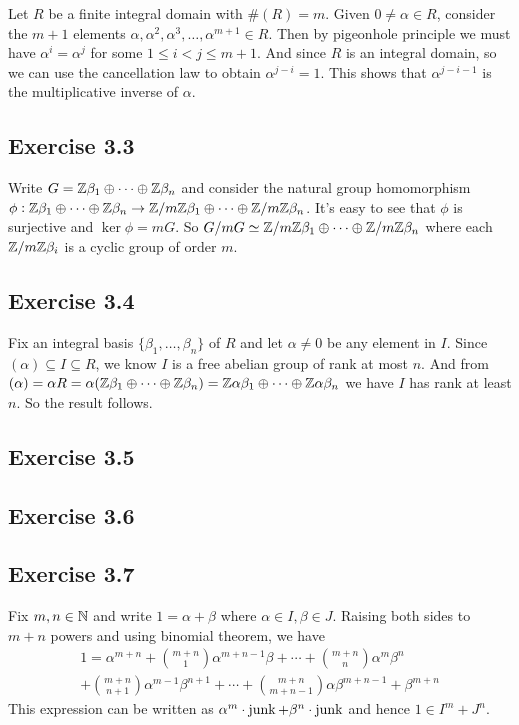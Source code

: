 \documentclass[../Marcus.tex]{subfiles}
\begin{document}
Let $R$ be a finite integral domain with $\#(R)=m$. Given $0\neq\alpha\in R$, consider the $m+1$ elements $\alpha,\alpha^2,\alpha^3,\ldots,\alpha^{m+1}\in R$. Then by pigeonhole principle we must have $\alpha^i=\alpha^j$ for some $1\leq i<j \leq m+1$. And since $R$ is an integral domain, so we can use the cancellation law to obtain $\alpha^{j-i}=1$. This shows that $\alpha^{j-i-1}$ is the multiplicative inverse of $\alpha$.

\subsection*{Exercise 3.3}

Write $G=\mathbb{Z}\beta_1\oplus\cdots\oplus\mathbb{Z}\beta_n$ and consider the natural group homomorphism $\phi:\mathbb{Z}\beta_1\oplus\cdots\oplus\mathbb{Z}\beta_n \to \mathbb{Z}/m\mathbb{Z}\beta_1\oplus\cdots\oplus\mathbb{Z}/m\mathbb{Z}\beta_n$. It's easy to see that $\phi$ is surjective and $\ker\phi=mG$. So $G/mG\simeq \mathbb{Z}/m\mathbb{Z}\beta_1\oplus\cdots\oplus\mathbb{Z}/m\mathbb{Z}\beta_n$ where each $\mathbb{Z}/m\mathbb{Z}\beta_i$ is a cyclic group of order $m$.

\subsection*{Exercise 3.4}

Fix an integral basis $\{\beta_1,\ldots,\beta_n\}$ of $R$ and let $\alpha\neq 0$ be any element in $I$. Since $(\alpha)\subseteq I \subseteq R$, we know $I$ is a free abelian group of rank at most $n$. And from $(\alpha)=\alpha R=\alpha(\mathbb{Z}\beta_1\oplus\cdots\oplus\mathbb{Z}\beta_n)=\mathbb{Z}\alpha\beta_1\oplus\cdots\oplus\mathbb{Z}\alpha\beta_n$ we have $I$ has rank at least $n$. So the result follows.

\subsection*{Exercise 3.5}

\subsection*{Exercise 3.6}

\subsection*{Exercise 3.7}

Fix $m,n\in\mathbb{N}$ and write $1=\alpha+\beta$ where $\alpha\in I,\beta\in J$. Raising both sides to $m+n$ powers and using binomial theorem, we have
\begin{multline*}
    1=\alpha^{m+n}+\binom{m+n}{1}\alpha^{m+n-1}\beta+\cdots+\binom{m+n}{n}\alpha^m\beta^n \\ +\binom{m+n}{n+1}\alpha^{m-1}\beta^{n+1}+\cdots+\binom{m+n}{m+n-1}\alpha\beta^{m+n-1}+\beta^{m+n}
\end{multline*}
This expression can be written as $\alpha^m\cdot\operatorname{junk}+\beta^n\cdot\operatorname{junk}$ and hence $1\in I^m+J^n$.
\end{document}
